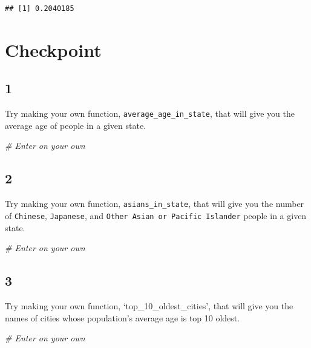 \documentclass[
]{book}
\newenvironment{Shaded}{\begin{snugshade}}{\end{snugshade}}
\newcommand{\CommentTok}[1]{\textcolor[rgb]{0.56,0.35,0.01}{\textit{#1}}}
\theoremstyle{definition}
\theoremstyle{definition}
\theoremstyle{definition}
\theoremstyle{definition}
\theoremstyle{remark}
\begin{document}
\begin{verbatim}
## [1] 0.2040185
\end{verbatim}

\hypertarget{checkpoint}{%
\section*{Checkpoint}\label{checkpoint}}

\hypertarget{section}{%
\subsection*{1}\label{section}}

Try making your own function, \texttt{average\_age\_in\_state}, that will give you the average age of people in a given state.

\begin{Shaded}
\begin{Highlighting}[]
\CommentTok{# Enter on your own}
\end{Highlighting}
\end{Shaded}

\hypertarget{section-1}{%
\subsection*{2}\label{section-1}}

Try making your own function, \texttt{asians\_in\_state}, that will give you the number of \texttt{Chinese}, \texttt{Japanese}, and \texttt{Other\ Asian\ or\ Pacific\ Islander} people in a given state.

\begin{Shaded}
\begin{Highlighting}[]
\CommentTok{# Enter on your own}
\end{Highlighting}
\end{Shaded}

\hypertarget{section-2}{%
\subsection*{3}\label{section-2}}

Try making your own function, `top\_10\_oldest\_cities', that will give you the names of cities whose population's average age is top 10 oldest.

\begin{Shaded}
\begin{Highlighting}[]
\CommentTok{# Enter on your own}
\end{Highlighting}
\end{Shaded}
\end{document}
